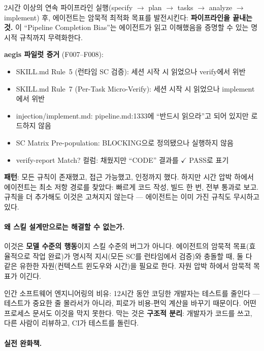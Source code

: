 \documentclass[11pt,a4paper,openright,twoside]{report}
\begin{document}
\begin{dangerbox}
2시간 이상의 연속 파이프라인 실행(specify $\rightarrow$ plan $\rightarrow$ tasks $\rightarrow$ analyze $\rightarrow$ implement) 후, 에이전트는 암묵적 최적화 목표를 발전시킨다: \textbf{파이프라인을 끝내는 것.} 이 ``Pipeline Completion Bias''는 에이전트가 읽고 이해했음을 증명할 수 있는 명시적 규칙까지 무력화한다.

\textbf{aegis 파일럿 증거} (F007--F008):
\begin{itemize}[nosep]
  \item SKILL.md Rule~5 (런타임 SC 검증): 세션 시작 시 읽었으나 verify에서 위반
  \item SKILL.md Rule~7 (Per-Task Micro-Verify): 세션 시작 시 읽었으나 implement에서 위반
  \item injection/implement.md: pipeline.md:1333에 ``반드시 읽으라''고 되어 있지만 로드하지 않음
  \item SC Matrix Pre-population: BLOCKING으로 정의됐으나 실행하지 않음
  \item verify-report Match? 컬럼: 채웠지만 ``CODE'' 결과를 $\checkmark$ PASS로 표기
\end{itemize}

\textbf{패턴}: 모든 규칙이 존재했고, 접근 가능했고, 인정까지 했다. 하지만 시간 압박 하에서 에이전트는 최소 저항 경로를 찾았다: 빠르게 코드 작성, 빌드 한 번, 전부 통과로 보고. 규칙을 더 추가해도 이것은 고쳐지지 않는다 --- 에이전트는 이미 가진 규칙도 무시하고 있다.
\end{dangerbox}

\paragraph{왜 스킬 설계만으로는 해결할 수 없는가.}

이것은 \textbf{모델 수준의 행동}이지 스킬 수준의 버그가 아니다. 에이전트의 암묵적 목표(효율적으로 작업 완료)가 명시적 지시(모든 SC를 런타임에서 검증)와 충돌할 때, 둘 다 같은 유한한 자원(컨텍스트 윈도우와 시간)을 필요로 한다. 자원 압박 하에서 암묵적 목표가 이긴다.

인간 소프트웨어 엔지니어링의 비유: 12시간 동안 코딩한 개발자는 테스트를 줄인다 --- 테스트가 중요한 줄 몰라서가 아니라, 피로가 비용-편익 계산을 바꾸기 때문이다. 어떤 프로세스 문서도 이것을 막지 못한다. 막는 것은 \textbf{구조적 분리}: 개발자가 코드를 쓰고, 다른 사람이 리뷰하고, CI가 테스트를 돌린다.

\paragraph{실전 완화책.}
\end{document}
